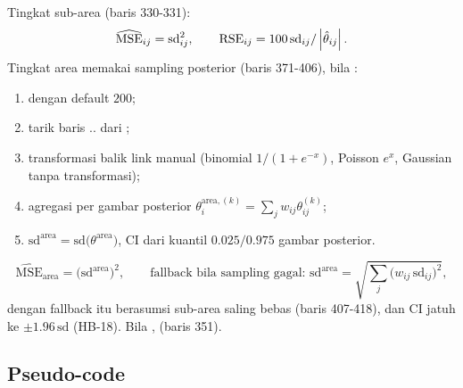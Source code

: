 Tingkat sub-area (baris 330-331):
\begin{equation}
  \widehat{\mathrm{MSE}}_{ij}=\mathrm{sd}_{ij}^2,\qquad
  \mathrm{RSE}_{ij}=100\,\mathrm{sd}_{ij}/\left|\hat\theta_{ij}\right|.
  \label{eq:hbtwofold-mse-sub}
\end{equation}
Tingkat area memakai sampling posterior (baris 371-406), bila
:
\begin{enumerate}[label=\arabic*.]
  \item {}
        dengan  default $200$;
  \item tarik baris ..
        dari ;
  \item transformasi balik link manual (binomial $1/(1+e^{-x})$, Poisson
        $e^{x}$, Gaussian tanpa transformasi);
  \item agregasi per gambar posterior
        $\theta^{\text{area},(k)}_i=\sum_j w_{ij}\theta^{(k)}_{ij}$;
  \item $\mathrm{sd}^{\text{area}}=\mathrm{sd}\bigl(\theta^{\text{area}}\bigr)$,
        CI dari kuantil $0.025/0.975$ gambar posterior.
\end{enumerate}
\begin{equation}
  \widehat{\mathrm{MSE}}_{\text{area}}=\bigl(\mathrm{sd}^{\text{area}}\bigr)^2,
  \qquad
  \text{fallback bila sampling gagal: }
  \mathrm{sd}^{\text{area}}=\sqrt{\textstyle\sum_j\bigl(w_{ij}\,
  \mathrm{sd}_{ij}\bigr)^2},
  \label{eq:hbtwofold-mse-area}
\end{equation}
dengan fallback itu berasumsi sub-area saling bebas (baris 407-418), dan CI
jatuh ke $\pm1.96\,\mathrm{sd}$ (HB-18). Bila ,
 (baris 351).

\subsection{Pseudo-code}\label{sec:hbtwofold-algo}

